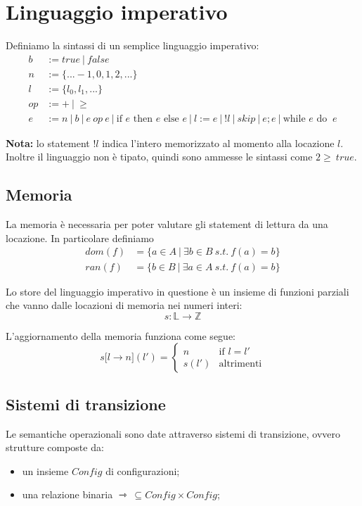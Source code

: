 \documentclass[a4paper, 11pt]{article}
\begin{document}
\section{Linguaggio imperativo} \label{imp}
Definiamo la sintassi di un semplice linguaggio imperativo:
\begin{align*}
	b &:= true\ |\ false \\
	n &:= \lbrace ... -1, 0, 1, 2, ...\rbrace\\
	l &:= \lbrace l_0, l_1, ... \rbrace \\
	op &:= +\ |\ \geq \\
	e &:= n\ |\ b\ |\ e\ op\ e\ |\ \text{if } e \text{ then } e \text{ else } e\ |\ l:=e\ |\ !l\ |\ skip\ |\ e;e\ |\ \text{while } e \text{ do }\ e
\end{align*}

\textbf{Nota:} lo statement $!l$ indica l'intero memorizzato al momento alla locazione $l$. Inoltre il linguaggio non è tipato, quindi sono ammesse le sintassi come $2 \geq\ true$.

\subsection{Memoria}
La memoria è necessaria per poter valutare gli statement di lettura da una locazione. In particolare definiamo \begin{align*}
 dom(f) &= \lbrace a \in A\ |\ \exists b \in B\ s.t.\ f(a)=b \rbrace  \\
 ran(f) &= \lbrace b \in B\ |\ \exists a \in A\ s.t.\ f(a)=b \rbrace
 \end{align*}
 
 Lo store del linguaggio imperativo in questione è un insieme di funzioni parziali che vanno dalle locazioni di memoria nei numeri interi: \[ s: \mathbb{L} \to \mathbb{Z} \]
 
 L'aggiornamento della memoria funziona come segue: \[ s \lbrack l \rightarrow n \rbrack (l') = \begin{cases}
 n &\text{if } l=l' \\
 s(l') &\text{altrimenti}
 \end{cases} \]
 
 \subsection{Sistemi di transizione}
 Le semantiche operazionali sono date attraverso sistemi di transizione, ovvero strutture composte da: \begin{itemize}
 	\item un insieme $Config$ di configurazioni;
 	\item una relazione binaria $\rightarrowtriangle\ \subseteq Config \times Config$;
 \end{itemize}
\end{document}
